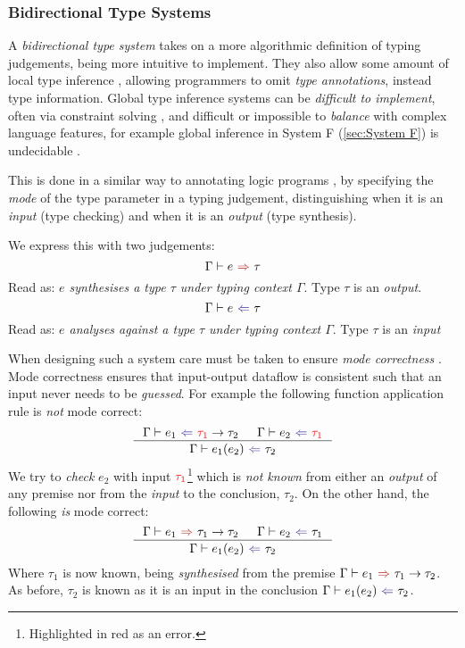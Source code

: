 \subsubsection{Bidirectional Type Systems}\label{sec:BidirectionalTypeSystem}
A \textit{bidirectional type system} \cite{BidirectionalTypes} takes on a more algorithmic definition of typing judgements, being more intuitive to implement. They also allow some amount of local type inference \cite{LocalInference}, allowing programmers to omit \textit{type annotations}, instead type information. Global type inference systems \cite[ch. 22]{TAPL} can be \textit{difficult to implement}, often via constraint solving \cite[ch. 10]{ATTAPL}, and difficult or impossible to \textit{balance} with complex language features, for example global inference in System F (\ref{sec:System F}) is undecidable \cite{SystemFUndecidable}.

This is done in a similar way to annotating logic programs \cite[123]{LogicProg}, by specifying the \textit{mode} of the type parameter in a typing judgement, distinguishing when it is an \textit{input} (type checking) and when it is an \textit{output} (type synthesis).

We express this with two judgements:
\[\synthesis{e}{\tau}\]
Read as: \textit{$e$ synthesises a type $\tau$ under typing context $\Gamma$}. Type $\tau$ is an \textit{output}.
\[\analysis{e}{\tau}\]
Read as: \textit{$e$ analyses against a type $\tau$ under typing context $\Gamma$}. Type $\tau$ is an \textit{input}

When designing such a system care must be taken to ensure \textit{mode correctness} \cite{ModeCorrectness}. Mode correctness ensures that input-output dataflow is consistent such that an input never needs to be \textit{guessed}. For example the following function application rule is \textit{not} mode correct:
\[\inference{\analysis{e_1}{{\color{red}\tau_1} \to \tau_2} & \analysis{e_2}{{\color{red}\tau_1}}}{\analysis{e_1(e_2)}{\tau_2}}\]
We try to \textit{check} $e_2$ with input ${\color{red}\tau_1}$\footnote{Highlighted in red as an error.} which is \textit{not known} from either an \textit{output} of any premise nor from the \textit{input} to the conclusion, $\tau_2$. On the other hand, the following \textit{is} mode correct:
\[\inference{\synthesis{e_1}{\tau_1 \to \tau_2} & \analysis{e_2}{\tau_1}}{\analysis{e_1(e_2)}{\tau_2}}\]
Where $\tau_1$ is now known, being \textit{synthesised} from the premise $\synthesis{e_1}{\tau_1 \to \tau_2}$. As before, $\tau_2$ is known as it is an input in the conclusion $\analysis{e_1(e_2)}{\tau_2}$.

